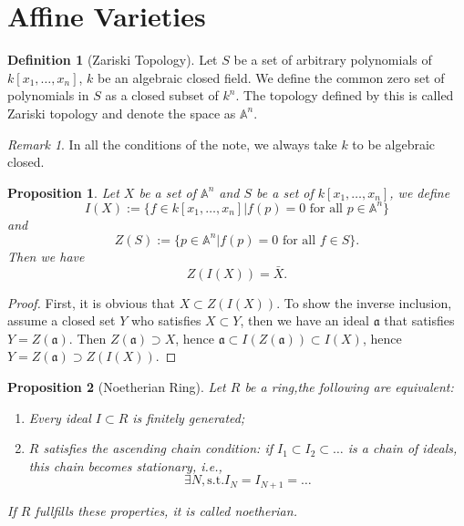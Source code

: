 \documentclass{amsart}
\theoremstyle{plain}
\newtheorem{proposition}{Proposition}
\theoremstyle{definition}
\newtheorem{definition}{Definition}
\theoremstyle{remark}
\newtheorem*{remark}{Remark}
\numberwithin{equation}{section}
\begin{document}
\section{Affine Varieties}
\begin{definition}[Zariski Topology]
	Let $ S $ be a set of arbitrary polynomials of $ k[x_1,\dots,x_n] $, $ k $ be an algebraic closed field. We define the common zero set of polynomials in $ S $ as a closed subset of $ k^n $. The topology defined by this is called  Zariski topology and denote the space as $ \mathbb{A}^n $.  
\end{definition}
\begin{remark}
	In all the conditions of the note, we always take $ k $ to be algebraic closed.
\end{remark}
\begin{proposition}
	Let $ X $ be a set of $ \mathbb{A}^n $ and $ S $ be a set of $ k[x_1,\dots,x_n] $, we define 
	\begin{equation*}
		I(X):=\{ f\in k[x_1,\dots,x_n]| f(p)=0 \text{ for all } p\in \mathbb{A}^n \}
	\end{equation*}
	and 
	\begin{equation*}
		Z(S):=\{ p\in\mathbb{A}^n| f(p)=0 \text{ for all } f\in S \}.
	\end{equation*}
	Then we have
	$$ Z(I(X)) = \bar{X}. $$
\end{proposition}
\begin{proof}
	First, it is obvious that $ X \subset Z(I(X)) $. To show the inverse inclusion, assume a closed set $ Y $ who satisfies $ X\subset Y $, then we have an ideal $ \mathfrak{a} $ that satisfies $ Y=Z(\mathfrak{a}) $. Then $ Z(\mathfrak{a})\supset X $, hence $ \mathfrak{a}\subset I(Z(\mathfrak{a}))\subset I(X) $, hence $ Y=Z(\mathfrak{a})\supset  Z(I(X))$.  
\end{proof}
\begin{proposition}[Noetherian Ring]
	Let $ R $ be a ring,the following are equivalent:
	\begin{enumerate}
		\item Every ideal $ I\subset R $ is finitely generated;
		\item $ R $ satisfies the ascending chain condition: if $ I_1\subset I_2\subset \dots  $ is a chain of ideals, this chain becomes stationary, i.e.,
		\begin{equation*}
		\exists N, \text{s.t.} I_{N}=I_{N+1}=\dots 
		\end{equation*}
	\end{enumerate}
	If $ R $ fullfills these properties, it is called noetherian. 
\end{proposition}
\end{document}

